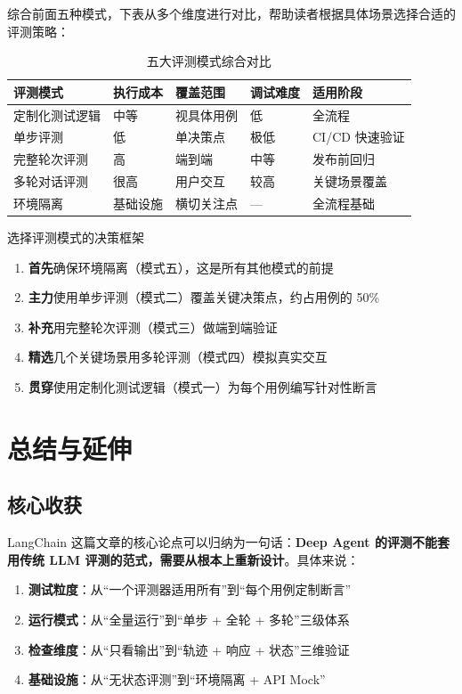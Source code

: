 \documentclass[a4paper]{article}
\begin{document}
综合前面五种模式，下表从多个维度进行对比，帮助读者根据具体场景选择合适的评测策略：

\begin{table}[H]
\centering
\caption{五大评测模式综合对比}
\small
\begin{tabular}{p{2.8cm}p{2cm}p{2cm}p{2cm}p{2.5cm}}
\toprule
\textbf{评测模式} & \textbf{执行成本} & \textbf{覆盖范围} & \textbf{调试难度} & \textbf{适用阶段} \\
\midrule
定制化测试逻辑 & 中等 & 视具体用例 & 低 & 全流程 \\
单步评测 & 低 & 单决策点 & 极低 & CI/CD 快速验证 \\
完整轮次评测 & 高 & 端到端 & 中等 & 发布前回归 \\
多轮对话评测 & 很高 & 用户交互 & 较高 & 关键场景覆盖 \\
环境隔离 & 基础设施 & 横切关注点 & --- & 全流程基础 \\
\bottomrule
\end{tabular}
\end{table}

\begin{importantbox}{选择评测模式的决策框架}
\begin{enumerate}
  \item \textbf{首先}确保环境隔离（模式五），这是所有其他模式的前提
  \item \textbf{主力}使用单步评测（模式二）覆盖关键决策点，约占用例的 50\%
  \item \textbf{补充}用完整轮次评测（模式三）做端到端验证
  \item \textbf{精选}几个关键场景用多轮评测（模式四）模拟真实交互
  \item \textbf{贯穿}使用定制化测试逻辑（模式一）为每个用例编写针对性断言
\end{enumerate}
\end{importantbox}


\section{总结与延伸}

\subsection{核心收获}

LangChain 这篇文章的核心论点可以归纳为一句话：\textbf{Deep Agent 的评测不能套用传统 LLM 评测的范式，需要从根本上重新设计}。具体来说：

\begin{enumerate}
  \item \textbf{测试粒度}：从``一个评测器适用所有''到``每个用例定制断言''
  \item \textbf{运行模式}：从``全量运行''到``单步 + 全轮 + 多轮''三级体系
  \item \textbf{检查维度}：从``只看输出''到``轨迹 + 响应 + 状态''三维验证
  \item \textbf{基础设施}：从``无状态评测''到``环境隔离 + API Mock''
\end{enumerate}
\end{document}
